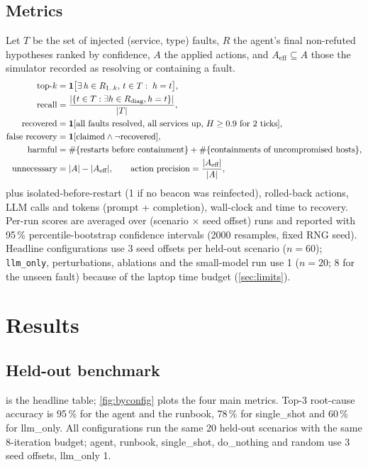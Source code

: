 \documentclass[11pt,a4paper]{article}
\newcommand{\code}[1]{\texttt{#1}}
\newcommand{\pct}[1]{#1\,\%}
\begin{document}
\subsection{Metrics}
Let $T$ be the set of injected (service, type) faults, $R$ the agent's final non-refuted hypotheses
ranked by confidence, $A$ the applied actions, and $A_{\text{eff}}\subseteq A$ those the simulator
recorded as resolving or containing a fault.
\begin{align}
  \text{top-}k &= \mathbf{1}\big[\exists\, h\in R_{1..k},\, t\in T:\; h=t\big], \notag\\
  \text{recall} &= \frac{|\{t\in T:\exists h\in R_{\text{diag}}, h=t\}|}{|T|}, \notag\\
  \text{recovered} &= \mathbf{1}[\text{all faults resolved, all services up, } H\ge0.9 \text{ for 2 ticks}], \notag\\
  \text{false recovery} &= \mathbf{1}[\text{claimed} \wedge \neg\text{recovered}], \notag\\
  \text{harmful} &= \#\{\text{restarts before containment}\} + \#\{\text{containments of uncompromised hosts}\}, \notag\\
  \text{unnecessary} &= |A| - |A_{\text{eff}}|, \qquad
  \text{action precision} = \frac{|A_{\text{eff}}|}{|A|},
  \label{eq:metrics}
\end{align}
plus isolated-before-restart (1 if no beacon was reinfected), rolled-back actions, LLM calls and
tokens (prompt + completion), wall-clock and time to recovery. Per-run scores are averaged over
(scenario $\times$ seed offset) runs and reported with \pct{95} percentile-bootstrap confidence
intervals (2000 resamples, fixed RNG seed). Headline configurations use 3 seed offsets per held-out
scenario ($n=60$); \code{llm\_only}, perturbations, ablations and the small-model run use 1
($n=20$; 8 for the unseen fault) because of the laptop time budget (\cref{sec:limits}).

\section{Results}
\label{sec:results}

\subsection{Held-out benchmark}
 is the headline table; \cref{fig:byconfig} plots the four main metrics. Top-3 root-cause accuracy is \pct{95} for the agent and the runbook, \pct{78} for single\_shot and \pct{60} for llm\_only.
All configurations run the same 20 held-out scenarios with the same 8-iteration budget; agent,
runbook, single\_shot, do\_nothing and random use 3 seed offsets, llm\_only 1.
\end{document}
